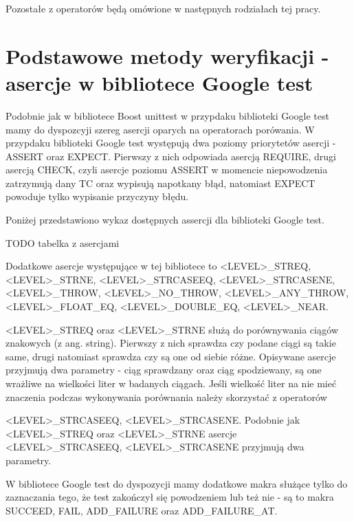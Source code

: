 \documentclass[12pt,a4paper,notitlepage]{report}
\begin{document}
Pozostałe z operatorów będą omówione w następnych rodziałach tej pracy.

			

\section{Podstawowe metody weryfikacji - asercje w bibliotece Google test}

Podobnie jak w bibliotece Boost unittest w przypdaku biblioteki Google test mamy do dyspozcyji szereg asercji oparych na operatorach porówania. W przypdaku biblioteki Google test występują dwa poziomy priorytetów asercji - ASSERT oraz EXPECT. Pierwszy z nich odpowiada asercją REQUIRE, drugi asercją CHECK, czyli asercje poziomu ASSERT w momencie niepowodzenia zatrzymują dany TC oraz wypisują napotkany błąd, natomiast EXPECT powoduje tylko wypisanie przyczyny błędu.

Poniżej przedstawiono wykaz dostępnych assercji dla biblioteki Google test.

TODO tabelka z asercjami

Dodatkowe asercje występujące w tej bibliotece to <LEVEL>{\_}STREQ, <LEVEL>{\_}STRNE, <LEVEL>{\_}STRCASEEQ, <LEVEL>{\_}STRCASENE, <LEVEL>{\_}THROW, <LEVEL>{\_}NO{\_}THROW, <LEVEL>{\_}ANY{\_}THROW, <LEVEL>{\_}FLOAT{\_}EQ, <LEVEL>{\_}DOUBLE{\_}EQ, <LEVEL>{\_}NEAR.

<LEVEL>{\_}STREQ oraz <LEVEL>{\_}STRNE służą do porównywania ciągów znakowych (z ang. string). Pierwszy z nich sprawdza czy podane ciągi są takie same, drugi natomiast sprawdza czy są one od siebie różne. Opisywane asercje przyjmują dwa parametry - ciąg sprawdzany oraz ciąg spodziewany, są one wrażliwe na wielkości liter w badanych ciągach. Jeśli wielkość liter na nie mieć znaczenia podczas wykonywania porównania należy skorzystać z operatorów 

<LEVEL>{\_}STRCASEEQ, <LEVEL>{\_}STRCASENE. Podobnie jak <LEVEL>{\_}STREQ oraz <LEVEL>{\_}STRNE asercje <LEVEL>{\_}STRCASEEQ, <LEVEL>{\_}STRCASENE przyjmują dwa parametry.

W bibliotece Google test do dyspozycji mamy dodatkowe makra służące tylko do zaznaczania tego, że test zakończył się powodzeniem lub też nie - są to makra SUCCEED, FAIL, ADD{\_}FAILURE oraz ADD{\_}FAILURE{\_}AT.
\end{document}
